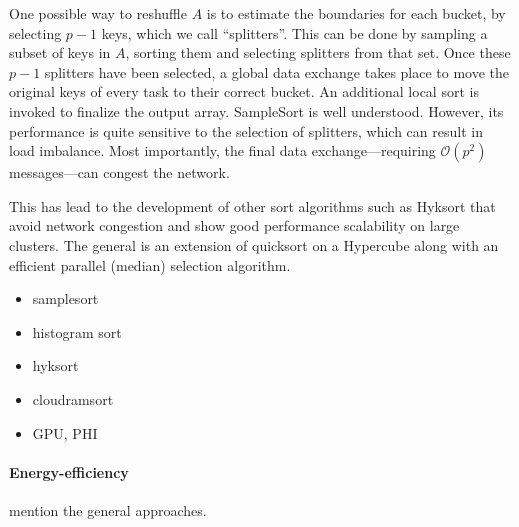 One possible way to reshuffle $A$ is to estimate the boundaries for each bucket, by selecting $p-1$ keys, which we call
``splitters''. This can be done  by sampling a
subset of keys in $A$, sorting them and selecting splitters from that set. Once these $p-1$ splitters have been
selected, a global data exchange takes place to move the original keys of every task to their correct bucket.
An additional local sort is invoked to finalize the output array. SampleSort is well understood. However, its performance is quite sensitive to the selection of splitters, which can result in load imbalance. Most importantly, the final data exchange---requiring $\mathcal{O}(p^2)$ messages---can congest the network.

This has lead to the development of other sort algorithms such as Hyksort\cite{hyksort} that avoid network congestion and show good performance scalability on large clusters. The general is an extension of quicksort on a Hypercube \cite{wagar87} along with an efficient parallel (median) selection algorithm. 

\begin{itemize}
  \item samplesort
  \item histogram sort
  \item hyksort
  \item cloudramsort
  \item GPU, PHI
\end{itemize}

\paragraph{Energy-efficiency}
mention the general approaches. 
